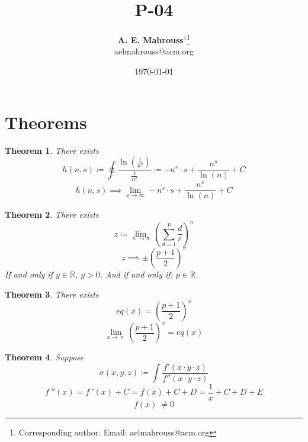 \documentclass[10pt, twocolumn]{article}
\title{%
  \vspace{-1.5em}%
  \large\textbf{P-04}%
}
\author{%
  \textbf{A. E. Mahrouss}$^{1}$\thanks{Corresponding author. Email: aelmahrouss@acm.org}
  \\aelmahrouss@acm.org\\[0.4em]
}
\date{%
  \small \today
}
\theoremstyle{plain}
\newtheorem{theorem}{Theorem}[section]
\theoremstyle{definition}
\theoremstyle{remark}
\begin{document}

\twocolumn[{%
  \maketitle
  \vspace{-0.5em}
  \vspace{0.8em}
  \rule{\linewidth}{0.4pt}
  \vspace{1em}
}]


\section{Theorems}
\begin{theorem}
  There exists
  \begin{equation}
    h(n, s) \coloneqq \oint \frac{\ln(\frac{1}{n^s})}{\frac{1}{n^s}}  \coloneq -n^s \cdot s+\frac{n^s}{\ln \left(n\right)}+C
  \end{equation}
  \begin{equation}
    h(n, s) \implies \lim _{x\to \infty } -n^s \cdot s+\frac{n^s}{\ln \left(n\right)}+C
  \end{equation}
\end{theorem}

\begin{theorem}
  There exists
  \begin{equation}
    z \coloneq \lim _{n\:\to \pi }\:(\sum_{d=1}^{p} \frac{d}{^p})^{n}
  \end{equation}
  \begin{equation}
    z \implies \pm \left(\frac{p+1}{2}\right)^{\pi }
  \end{equation}
  If and only if $y \in \mathbb{R}$, $y > 0$. And if and only if: $p \in \mathbb{R}$.
\end{theorem}

\begin{theorem}
  There exists
  \begin{equation}
    eq(x) = \left(\frac{p+1}{2}\right)^{x}
  \end{equation}
  \begin{equation}
    \lim_{x \to \operatorname{e}} \left(\frac{p+1}{2}\right)^{x } = eq(x)
  \end{equation}
\end{theorem}

\begin{theorem}
  Suppose
  \begin{equation}
    \sigma(x, y, z) \coloneq \int \frac{f'(x \cdot y \cdot z)}{f''(x \cdot y \cdot z)}
  \end{equation}
  \begin{equation}
    f\:''\left(x\right)= f\:'\left(x\right)+C=f\left(x\right)+C + D=\frac{1}{x} + C + D + E
  \end{equation}
  \begin{equation}
    f\left(x\right)\:\ne 0
  \end{equation}
\end{theorem}
\end{document}
